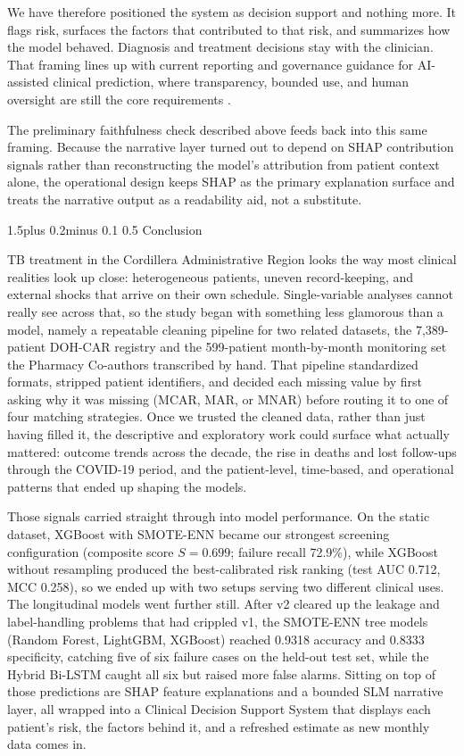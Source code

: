 \documentclass[12pt]{article}
\makeatletter
\renewcommand{\_}{\textunderscore\allowbreak}
\renewcommand{\section}{\@startsection{section}{1}{0pt}%
  {1.5\baselineskip plus 0.2\baselineskip minus 0.1\baselineskip}%
  {0.5\baselineskip}%
  {\centering\bfseries\normalsize}}
\makeatother
\begin{document}
We have therefore positioned the system as decision support and nothing more. It flags risk, surfaces the factors that contributed to that risk, and summarizes how the model behaved. Diagnosis and treatment decisions stay with the clinician. That framing lines up with current reporting and governance guidance for AI-assisted clinical prediction, where transparency, bounded use, and human oversight are still the core requirements \citep{ref44}.

The preliminary faithfulness check described above feeds back into this same framing. Because the narrative layer turned out to depend on SHAP contribution signals rather than reconstructing the model's attribution from patient context alone, the operational design keeps SHAP as the primary explanation surface and treats the narrative output as a readability aid, not a substitute.

\FloatBarrier
\section{Conclusion}

TB treatment in the Cordillera Administrative Region looks the way most clinical realities look up close: heterogeneous patients, uneven record-keeping, and external shocks that arrive on their own schedule. Single-variable analyses cannot really see across that, so the study began with something less glamorous than a model, namely a repeatable cleaning pipeline for two related datasets, the 7,389-patient DOH-CAR registry and the 599-patient month-by-month monitoring set the Pharmacy Co-authors transcribed by hand. That pipeline standardized formats, stripped patient identifiers, and decided each missing value by first asking why it was missing (MCAR, MAR, or MNAR) before routing it to one of four matching strategies. Once we trusted the cleaned data, rather than just having filled it, the descriptive and exploratory work could surface what actually mattered: outcome trends across the decade, the rise in deaths and lost follow-ups through the COVID-19 period, and the patient-level, time-based, and operational patterns that ended up shaping the models.

Those signals carried straight through into model performance. On the static dataset, XGBoost with SMOTE-ENN became our strongest screening configuration (composite score $S = 0.699$; failure recall 72.9\%), while XGBoost without resampling produced the best-calibrated risk ranking (test AUC 0.712, MCC 0.258), so we ended up with two setups serving two different clinical uses. The longitudinal models went further still. After v2 cleared up the leakage and label-handling problems that had crippled v1, the SMOTE-ENN tree models (Random Forest, LightGBM, XGBoost) reached 0.9318 accuracy and 0.8333 specificity, catching five of six failure cases on the held-out test set, while the Hybrid Bi-LSTM caught all six but raised more false alarms. Sitting on top of those predictions are SHAP feature explanations and a bounded SLM narrative layer, all wrapped into a Clinical Decision Support System that displays each patient's risk, the factors behind it, and a refreshed estimate as new monthly data comes in.
\end{document}
